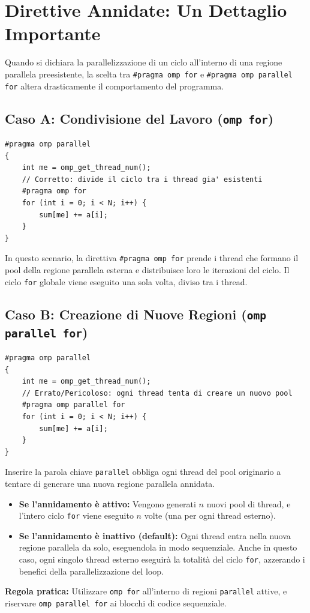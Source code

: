 \section{Direttive Annidate: Un Dettaglio Importante}

Quando si dichiara la parallelizzazione di un ciclo all'interno di una regione parallela preesistente, la scelta tra \texttt{\#pragma omp for} e \texttt{\#pragma omp parallel for} altera drasticamente il comportamento del programma.

\subsection{Caso A: Condivisione del Lavoro (\texttt{omp for})}

\begin{verbatim}
#pragma omp parallel
{
    int me = omp_get_thread_num();
    // Corretto: divide il ciclo tra i thread gia' esistenti
    #pragma omp for
    for (int i = 0; i < N; i++) {
        sum[me] += a[i];
    }
}
\end{verbatim}

In questo scenario, la direttiva \texttt{\#pragma omp for} prende i thread che formano il pool della regione parallela esterna e distribuisce loro le iterazioni del ciclo. Il ciclo \texttt{for} globale viene eseguito una sola volta, diviso tra i thread.

\subsection{Caso B: Creazione di Nuove Regioni (\texttt{omp parallel for})}

\begin{verbatim}
#pragma omp parallel
{
    int me = omp_get_thread_num();
    // Errato/Pericoloso: ogni thread tenta di creare un nuovo pool
    #pragma omp parallel for
    for (int i = 0; i < N; i++) {
        sum[me] += a[i];
    }
}  
\end{verbatim}


Inserire la parola chiave \texttt{parallel} obbliga ogni thread del pool originario a tentare di generare una nuova regione parallela annidata.
\begin{itemize}
    \item \textbf{Se l'annidamento è attivo:} Vengono generati $n$ nuovi pool di thread, e l'intero ciclo \texttt{for} viene eseguito $n$ volte (una per ogni thread esterno).
    \item \textbf{Se l'annidamento è inattivo (default):} Ogni thread entra nella nuova regione parallela da solo, eseguendola in modo sequenziale. Anche in questo caso, ogni singolo thread esterno eseguirà la totalità del ciclo \texttt{for}, azzerando i benefici della parallelizzazione del loop.
\end{itemize}
\textbf{Regola pratica:} Utilizzare \texttt{omp for} all'interno di regioni \texttt{parallel} attive, e riservare \texttt{omp parallel for} ai blocchi di codice sequenziale.


